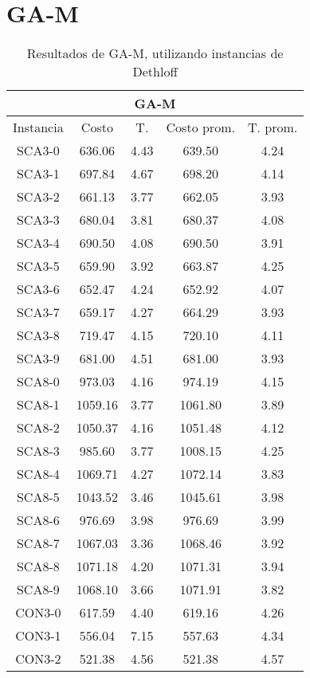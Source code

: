 \clearpage
\section{GA-M}\label{tablas-finales-ga}

\begin{minipage}[h]{0.45\linewidth}
\begin{table}[H]
\scriptsize 
\caption{ Resultados de GA-M, utilizando instancias de Dethloff }
\centering 
\begin{tabular}{|c||c c c c|}
\hline
 \multicolumn{5}{|c|}{\bf{GA-M}}\\\hline
Instancia & Costo & T. & Costo prom. & T. prom.\\ [0.5ex]
\hline\hline
SCA3-0 & 636.06 & 4.43 & 639.50 & 4.24\\
SCA3-1 & 697.84 & 4.67 & 698.20 & 4.14\\
SCA3-2 & 661.13 & 3.77 & 662.05 & 3.93\\
SCA3-3 & 680.04 & 3.81 & 680.37 & 4.08\\
SCA3-4 & 690.50 & 4.08 & 690.50 & 3.91\\
SCA3-5 & 659.90 & 3.92 & 663.87 & 4.25\\
SCA3-6 & 652.47 & 4.24 & 652.92 & 4.07\\
SCA3-7 & 659.17 & 4.27 & 664.29 & 3.93\\
SCA3-8 & 719.47 & 4.15 & 720.10 & 4.11\\
SCA3-9 & 681.00 & 4.51 & 681.00 & 3.93\\
SCA8-0 & 973.03 & 4.16 & 974.19 & 4.15\\
SCA8-1 & 1059.16 & 3.77 & 1061.80 & 3.89\\
SCA8-2 & 1050.37 & 4.16 & 1051.48 & 4.12\\
SCA8-3 & 985.60 & 3.77 & 1008.15 & 4.25\\
SCA8-4 & 1069.71 & 4.27 & 1072.14 & 3.83\\
SCA8-5 & 1043.52 & 3.46 & 1045.61 & 3.98\\
SCA8-6 & 976.69 & 3.98 & 976.69 & 3.99\\
SCA8-7 & 1067.03 & 3.36 & 1068.46 & 3.92\\
SCA8-8 & 1071.18 & 4.20 & 1071.31 & 3.94\\
SCA8-9 & 1068.10 & 3.66 & 1071.91 & 3.82\\
CON3-0 & 617.59 & 4.40 & 619.16 & 4.26\\
CON3-1 & 556.04 & 7.15 & 557.63 & 4.34\\
CON3-2 & 521.38 & 4.56 & 521.38 & 4.57\\

\end{tabular}
\end{table}
\end{minipage}
